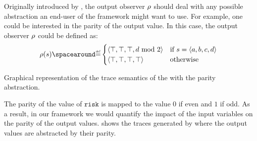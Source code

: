 \begin{example}
  Originally introduced by , the output observer $\rho$ should deal with any possible abstraction an end-user of the framework might want to use.
  For example, one could be interested in the parity of the output value.
  In this case, the output observer $\rho$ could be defined as:
  \[
  \outputobs(\defstate) \DefeQ \begin{cases}
    \langle \top, \top, \top, d \!\!\mod 2 \rangle & \text{if } \defstate = \langle a, b, c, d \rangle \\
    \langle \top, \top, \top, \top \rangle & \text{otherwise}
  \end{cases}
  \]
  \begin{marginfigure}[*-9]
    \centering
  \caption{Graphical representation of the trace semantics of the  with the parity abstraction.}
  \end{marginfigure}
  The parity of the value of $\texttt{risk}$ is mapped to the value $0$ if even and $1$ if odd.
  As a result, in our framework we would quantify the impact of the input variables on the parity of the output values.
   shows the traces generated by  where the output values are abstracted by their parity.
\end{example}



